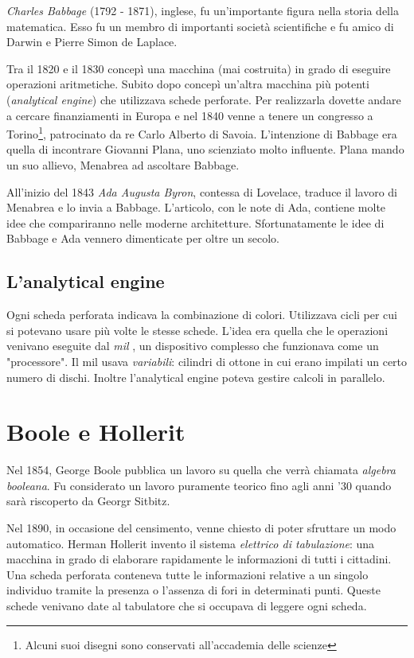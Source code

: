 \textit{Charles Babbage} (1792 - 1871), inglese, fu un'importante figura nella storia della matematica. Esso fu un membro di importanti società scientifiche e fu amico di Darwin e Pierre Simon de Laplace. 

Tra il 1820 e il 1830 concepì una macchina (mai costruita) in grado di eseguire operazioni aritmetiche. Subito dopo concepì un'altra macchina più potenti (\textit{analytical engine}) che utilizzava schede perforate. Per realizzarla dovette andare a cercare finanziamenti in Europa e nel 1840 venne a tenere un congresso a Torino\footnote{Alcuni suoi disegni sono conservati all'accademia delle scienze}, patrocinato da re Carlo Alberto di Savoia. L'intenzione di Babbage era quella di incontrare Giovanni Plana, uno scienziato molto influente. Plana mando un suo allievo, Menabrea ad ascoltare Babbage.

All'inizio del 1843 \textit{Ada Augusta Byron}, contessa di Lovelace, traduce il lavoro di Menabrea e lo invia a Babbage. L'articolo, con le note di Ada, contiene molte idee che compariranno nelle moderne architetture. Sfortunatamente le idee di Babbage e Ada vennero dimenticate per oltre un secolo.

\subsection{L'analytical engine}

Ogni scheda perforata indicava la combinazione di colori. Utilizzava cicli per cui si potevano usare più volte le stesse schede. 
L'idea era quella che le operazioni venivano eseguite dal \textit{mil} , un dispositivo complesso che funzionava come un "processore". Il mil  usava \textit{variabili}: cilindri di ottone in cui erano impilati un certo numero di dischi. Inoltre l'analytical engine poteva gestire calcoli in parallelo.

\section{Boole e Hollerit}

Nel 1854, George Boole pubblica un lavoro su quella che verrà chiamata \textit{algebra booleana}. Fu considerato un lavoro puramente teorico fino agli anni '30 quando sarà riscoperto da Georgr Sitbitz.

Nel 1890, in occasione del censimento, venne chiesto di poter sfruttare un modo automatico. Herman Hollerit invento il sistema \textit{elettrico di tabulazione}: una macchina in grado di elaborare rapidamente le informazioni di tutti i cittadini. Una scheda perforata conteneva tutte le informazioni relative a un singolo individuo tramite la presenza o l'assenza di fori in determinati punti. Queste schede venivano date al tabulatore che si occupava di leggere ogni scheda.

